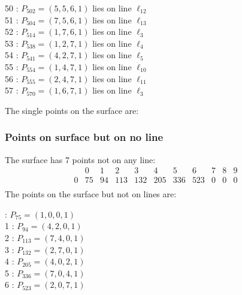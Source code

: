 \documentclass{article}
\begin{document}
{\begin{multicols}{2}
50 : $P_{502}=( 5, 5, 6, 1 )$ lies on line $\ell_{12}$\\
51 : $P_{504}=( 7, 5, 6, 1 )$ lies on line $\ell_{13}$\\
52 : $P_{514}=( 1, 7, 6, 1 )$ lies on line $\ell_{3}$\\
53 : $P_{538}=( 1, 2, 7, 1 )$ lies on line $\ell_{4}$\\
54 : $P_{541}=( 4, 2, 7, 1 )$ lies on line $\ell_{5}$\\
55 : $P_{554}=( 1, 4, 7, 1 )$ lies on line $\ell_{10}$\\
56 : $P_{555}=( 2, 4, 7, 1 )$ lies on line $\ell_{11}$\\
57 : $P_{570}=( 1, 6, 7, 1 )$ lies on line $\ell_{3}$\\
\end{multicols}
The single points on the surface are:\\
\subsubsection*{Points on surface but on no line}
The surface has 7 points not on any line:\\
$$
\begin{array}{r|*{10}{r}}
 & 0 & 1 & 2 & 3 & 4 & 5 & 6 & 7 & 8 & 9\\
\hline
0 & 75 & 94 & 113 & 132 & 205 & 336 & 523 & 0 & 0 & 0\\
\end{array}
$$
The points on the surface but not on lines are:\\
\begin{multicols}{2}
 : $P_{75}=( 1, 0, 0, 1 )$\\
1 : $P_{94}=( 4, 2, 0, 1 )$\\
2 : $P_{113}=( 7, 4, 0, 1 )$\\
3 : $P_{132}=( 2, 7, 0, 1 )$\\
4 : $P_{205}=( 4, 0, 2, 1 )$\\
5 : $P_{336}=( 7, 0, 4, 1 )$\\
6 : $P_{523}=( 2, 0, 7, 1 )$\\
\end{multicols}
}
\end{document}
